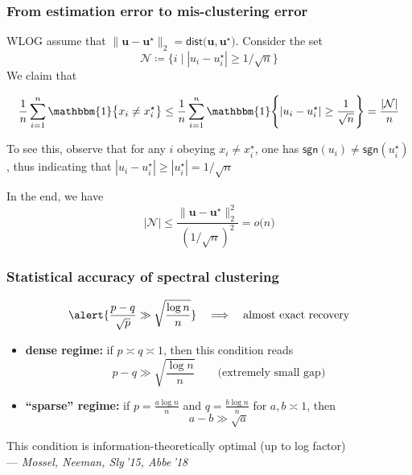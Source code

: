 \documentclass[compress,
mathserif,wide,%
]{beamer}
\begin{document}
\begin{frame}
	\frametitle{From estimation error to mis-clustering error}
	WLOG assume that $\|\bm{u}-\bm{u}^{\star}\|_{2}=\mathsf{dist}\big(\bm{u},\bm{u}^{\star}\big)$. Consider the set
%
$$
	\mathcal{N}\coloneqq \big\{ i\mid |u_{i}-u_{i}^{\star}| \geq {1}/{\sqrt{n}}\big\}
$$
We claim that 

\[
	\frac{1}{n}\sum_{i=1}^{n} \mathbbm{1} \big\{ x_{i}\neq x_{i}^{\star}\big\}
	\leq \frac{1}{n}\sum_{i=1}^{n} \mathbbm{1} \Bigg \{ |u_i - u_{i}^{\star}| \geq \frac{1}{\sqrt{n}} \Bigg\}
	= \frac{|\mathcal{N}|}{n}
\]
	
	To see this, observe that for any $i$ obeying $x_{i}\neq x_{i}^{\star}$, one has $\mathsf{sgn}(u_{i})\neq \mathsf{sgn}(u_{i}^{\star})$,
thus indicating that $|u_i - u_{i}^{\star}| \geq |u_{i}^{\star}| = 1/\sqrt{n}$

In the end, we have
\[
|\mathcal{N}|\leq\frac{\|\bm{u}-\bm{u}^{\star}\|_{2}^{2}}{(1/\sqrt{n})^{2}}=o\big(n\big)
\]
\end{frame}


\begin{frame}
\frametitle{Statistical accuracy of spectral clustering}

\[
	\alert{\frac{p-q}{\sqrt{p}}\gg \sqrt{\frac{\log n}{n}}} \quad \Longrightarrow \quad \text{almost exact recovery} 
\]

\begin{itemize}
	\item {\bf dense regime:} if $p\asymp q \asymp 1$, then this condition reads
	      \[
			p-q \gg \sqrt{\frac{\log n}{n}} \qquad \text{(extremely small gap)}
	      \]
        \item {\bf ``sparse'' regime:} if $p = \frac{a\log n}{n}$ and $q = \frac{b \log n}{n}$ for  $a,b\asymp 1$, then 
	      \[
		      a - b \gg \sqrt{a} 
	      \]

\end{itemize}


{

\begin{varblock}[\textwidth]{}
\begin{center}
	This  condition is information-theoretically optimal (up to log factor) \\
	\hfill --- {\em Mossel, Neeman, Sly\,'15, Abbe\,'18}
\end{center}
\end{varblock}
}


\end{frame}
\end{document}
